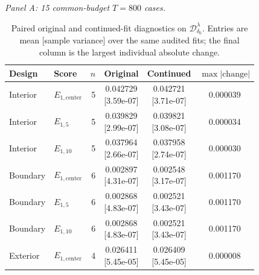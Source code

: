 \documentclass[12pt,letterpaper]{article}
\def\spacingset#1{\renewcommand{\baselinestretch}{#1}\small\normalsize}
\theoremstyle{plain}
\theoremstyle{definition}
\begin{document}
\clearpage
\begin{table}[p]
\begingroup
\spacingset{1.0}
\small\centering
\caption{Paired original and continued-fit diagnostics on $\mathcal D^\lambda_{\delta_0}$. Entries are mean [sample variance] over the same audited fits; the final column is the largest individual absolute change.}
\label{s23:lambda:selectedtab:cap_iteration}
\footnotesize
\setlength{\tabcolsep}{4pt}
\renewcommand{\arraystretch}{1.03}
\textit{Panel A: 15 common-budget $T=800$ cases.}\par\smallskip
\begin{adjustbox}{max width=\linewidth}
\begin{tabular}{llrccc}
\toprule
Design & Score & $n$ & Original & Continued & $\max|\mathrm{change}|$\\
\midrule
Interior & $E_{1,\mathrm{center}}$ & 5 & \shortstack{0.042729\\[-1pt]{\scriptsize[3.59e-07]}} & \shortstack{0.042721\\[-1pt]{\scriptsize[3.71e-07]}} & 0.000039\\
Interior & $E_{1,5}$ & 5 & \shortstack{0.039829\\[-1pt]{\scriptsize[2.99e-07]}} & \shortstack{0.039821\\[-1pt]{\scriptsize[3.08e-07]}} & 0.000034\\
Interior & $E_{1,10}$ & 5 & \shortstack{0.037964\\[-1pt]{\scriptsize[2.66e-07]}} & \shortstack{0.037958\\[-1pt]{\scriptsize[2.74e-07]}} & 0.000030\\
\addlinespace
Boundary & $E_{1,\mathrm{center}}$ & 6 & \shortstack{0.002897\\[-1pt]{\scriptsize[4.31e-07]}} & \shortstack{0.002548\\[-1pt]{\scriptsize[3.17e-07]}} & 0.001170\\
Boundary & $E_{1,5}$ & 6 & \shortstack{0.002868\\[-1pt]{\scriptsize[4.83e-07]}} & \shortstack{0.002521\\[-1pt]{\scriptsize[3.43e-07]}} & 0.001170\\
Boundary & $E_{1,10}$ & 6 & \shortstack{0.002868\\[-1pt]{\scriptsize[4.83e-07]}} & \shortstack{0.002521\\[-1pt]{\scriptsize[3.43e-07]}} & 0.001170\\
\addlinespace
Exterior & $E_{1,\mathrm{center}}$ & 4 & \shortstack{0.026411\\[-1pt]{\scriptsize[5.45e-05]}} & \shortstack{0.026409\\[-1pt]{\scriptsize[5.45e-05]}} & 0.000008\\

\end{tabular}
\end{adjustbox}
\end{table}
\end{document}
